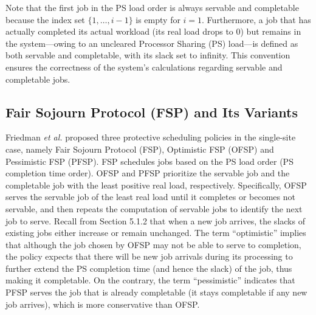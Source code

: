 

Note that the first job in the PS load order is always servable and completable because the index set $\{1, \dots, i-1\}$ is empty for $i = 1$. Furthermore, a job that has actually completed its actual workload (its real load drops to $0$) but remains in the system—owing to an uncleared Processor Sharing (PS) load—is defined as both servable and completable, with its slack set to infinity. This convention ensures the correctness of the system's calculations regarding servable and completable jobs. 

\subsection{Fair Sojourn Protocol (FSP) and Its Variants}
Friedman \textit{et al.} \cite{friedman2003protective} proposed three protective scheduling policies in the single-site case, namely Fair Sojourn Protocol (FSP), Optimistic FSP (OFSP) and Pessimistic FSP (PFSP). FSP schedules jobs based on the PS load order (PS completion time order). OFSP and PFSP prioritize the servable job and the completable job with the least positive real load, respectively. Specifically, OFSP serves the servable job of the least real load until it completes or becomes not servable, and then repeats the computation of servable jobs to identify the next job to serve. Recall from Section 5.1.2 that when a new job arrives, the slacks of existing jobs either increase or remain unchanged. The term ``optimistic'' implies that although the job chosen by OFSP may not be able to serve to completion, the policy expects that there will be new job arrivals during its processing to further extend the PS completion time (and hence the slack) of the job, thus making it completable. On the contrary, the term ``pessimistic'' indicates that PFSP serves the job that is already completable (it stays completable if any new job arrives), which is more conservative than OFSP.

